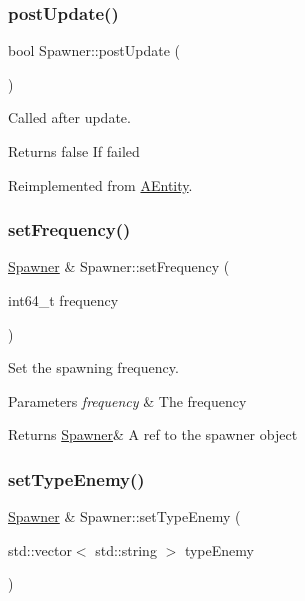 \subsubsection{\texorpdfstring{post\+Update()}{postUpdate()}}
{\footnotesize\ttfamily bool Spawner\+::post\+Update (\begin{DoxyParamCaption}{ }\end{DoxyParamCaption})\hspace{0.3cm}{\ttfamily [virtual]}}



Called after update. 

\begin{DoxyReturn}{Returns}
false If failed 
\end{DoxyReturn}


Reimplemented from \hyperlink{class_a_entity_ae2faa1d11e21033a223fef2bc03b9338}{A\+Entity}.

\mbox{\label{class_spawner_a42aed9baf9f387c892116b7bcacd820a}} 
\subsubsection{\texorpdfstring{set\+Frequency()}{setFrequency()}}
{\footnotesize\ttfamily \hyperlink{class_spawner}{Spawner} \& Spawner\+::set\+Frequency (\begin{DoxyParamCaption}\item[{int64\+\_\+t}]{frequency }\end{DoxyParamCaption})}



Set the spawning frequency. 


\begin{DoxyParams}{Parameters}
{\em frequency} & The frequency \\
\hline
\end{DoxyParams}
\begin{DoxyReturn}{Returns}
\hyperlink{class_spawner}{Spawner}\& A ref to the spawner object 
\end{DoxyReturn}
\mbox{\label{class_spawner_a483e98b9d3c20f59332feb500ceb6199}} 
\subsubsection{\texorpdfstring{set\+Type\+Enemy()}{setTypeEnemy()}}
{\footnotesize\ttfamily \hyperlink{class_spawner}{Spawner} \& Spawner\+::set\+Type\+Enemy (\begin{DoxyParamCaption}\item[{std\+::vector$<$ std\+::string $>$}]{type\+Enemy }\end{DoxyParamCaption})}



